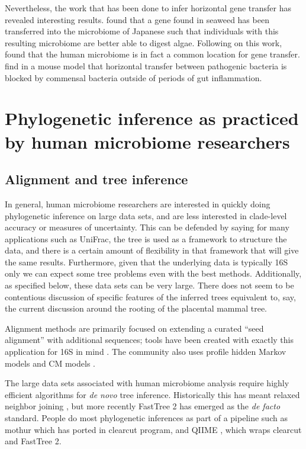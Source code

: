 \documentclass{amsart}
\begin{document}
Nevertheless, the work that has been done to infer horizontal gene transfer has revealed interesting results.
\citet{hehemann2010transfer} found that a gene found in seaweed has been transferred into the microbiome of Japanese such that individuals with this resulting microbiome are better able to digest algae.
Following on this work, \citet{smillie2011ecology} found that the human microbiome is in fact a common location for gene transfer.
\citet{stecher2012gut} find in a mouse model that horizontal transfer between pathogenic bacteria is blocked by commensal bacteria outside of periods of gut inflammation.


\section{Phylogenetic inference as practiced by human microbiome researchers}

\subsection{Alignment and tree inference}
In general, human microbiome researchers are interested in quickly doing phylogenetic inference on large data sets, and are less interested in clade-level accuracy or measures of uncertainty.
This can be defended by saying for many applications such as UniFrac, the tree is used as a framework to structure the data, and there is a certain amount of flexibility in that framework that will give the same results.
Furthermore, given that the underlying data is typically 16S only we can expect some tree problems even with the best methods.
Additionally, as specified below, these data sets can be very large.
There does not seem to be contentious discussion of specific features of the inferred trees equivalent to, say, the current discussion around the rooting of the placental mammal tree.

Alignment methods are primarily focused on extending a curated ``seed alignment'' with additional sequences; tools have been created with exactly this application for 16S in mind \citep{desantis2006nast,caporaso2010pynast,pruesse2012sina}.
The community also uses profile hidden Markov models \citep{eddy1998profile} and CM models \citep{nawrocki2009infernal,nawrocki2009structural}.

The large data sets associated with human microbiome analysis require highly efficient algorithms for \emph{de novo} tree inference.
Historically this has meant relaxed neighbor joining \citep{evans2006relaxed,sheneman2006clearcut}, but more recently FastTree 2 \citep{price2010fasttree} has emerged as the \textit{de facto} standard.
People do most phylogenetic inferences as part of a pipeline such as mothur \citep{schloss2009introducing} which has ported in clearcut \citep{evans2006relaxed,sheneman2006clearcut} program, and QIIME \citep{caporaso2010qiime}, which wraps clearcut and FastTree 2.
\end{document}
